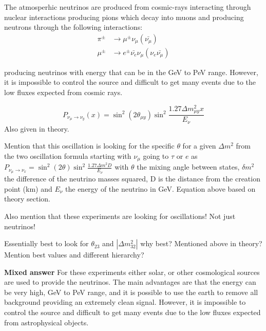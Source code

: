 The atmosperhic neutrinos are produced from cosmic-rays interacting through nuclear interactions producing pions which decay into muons and producing neutrons through the following interactions:
\begin{align}
\pi^{\pm} &\rightarrow \mu^{\pm}  \nu_\mu (\bar{\nu_\mu}) \\
\mu^{\pm} &\rightarrow e^{\pm} \bar{\nu_e}  \nu_\mu  (\nu_e \bar{\nu_\mu})
\end{align}

producing neutrinos with energy that can be in the GeV to PeV range. However, it is impossible to control the source and difficult to get many events due to the low fluxes expected from cosmic rays. 

\begin{equation}
P_{\nu_\mu \rightarrow \nu_y} (x) = \sin^2(2\theta_{\mu y})\sin^2 \frac{1.27\Delta m_{\mu y}^2 x}{E_\nu}
\end{equation}
Also given in theory.

Mention that this oscillation is looking for the specific $\theta$ for a given $\Delta m^2$ from the two oscillation formula starting with $\nu_\mu$ going to $\tau$ or $e$ as $P_{\nu_\mu \rightarrow \nu_x} = \sin^2(2\theta)\sin^2 \frac{1.27\Delta m^2 D}{E_\nu}$ with $\theta$ the mixing angle between states, $\delta m^2$ the difference of the neutrino masses squared, D is the distance from the creation point (km) and $E_\nu$  the energy of the neutrino in GeV. Equation above based on theory section.

Also mention that these experiments are looking for oscillations! Not just neutrinos! 


Essentially best to look for $\theta_23$ and $|\Delta m_{32}^2 |$ why best? Mentioned above in theory? Mention best values and different hierarchy?

\textbf{Mixed answer}
For these experiments either solar, or other cosmological sources are used to provide the neutrinos. The main advantages are that the energy can be very high, GeV to PeV range, and it is possible to use the earth to remove all background providing an extremely clean signal. However, it is impossible to control the source and difficult to get many events due to the low fluxes expected from astrophysical objects. 





